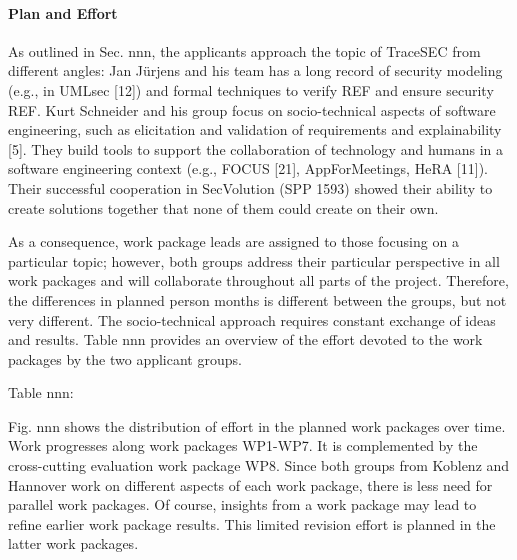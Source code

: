 \paragraph*{Plan and Effort}
As outlined in Sec. nnn, the applicants approach the topic of TraceSEC from different angles: Jan Jürjens and his team has a long record of security modeling (e.g., in UMLsec [12]) and formal techniques to verify REF and ensure security REF. Kurt Schneider and his group focus on socio-technical aspects of software engineering, such as elicitation and validation of requirements and explainability [5]. They build tools to support the collaboration of technology and humans in a software engineering context (e.g., FOCUS [21], AppForMeetings, HeRA [11]). Their successful cooperation in SecVolution (SPP 1593) showed their ability to create solutions together that none of them could create on their own. 

As a consequence, work package leads are assigned to those focusing on a particular topic; however, both groups address their particular perspective in all work packages and will collaborate throughout all parts of the project. Therefore, the differences in planned person months is different between the groups, but not very different. The socio-technical approach requires constant exchange of ideas and results. Table nnn provides an overview of the effort devoted to the work packages by the two applicant groups. 

Table nnn:


Fig. nnn shows the distribution of effort in the planned work packages over time. Work progresses along work packages WP1-WP7. It is complemented by the cross-cutting evaluation work package WP8. Since both groups from Koblenz and Hannover work on different aspects of each work package, there is less need for parallel work packages. Of course, insights from a work package may lead to refine earlier work package results. This limited revision effort is planned in the latter work packages.

